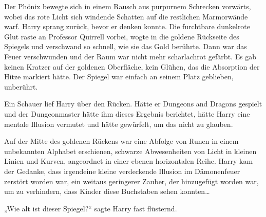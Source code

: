 Der Phönix bewegte sich in einem Rausch aus purpurnem Schrecken vorwärts, wobei das rote Licht sich windende Schatten auf die restlichen Marmorwände warf. Harry sprang zurück, bevor er denken konnte.
Die furchtbare dunkelrote Glut raste an Professor Quirrell vorbei, wogte in die goldene Rückseite des Spiegels und verschwand so schnell, wie sie das Gold berührte.
Dann war das Feuer verschwunden und der Raum war nicht mehr scharlachrot gefärbt.
Es gab keinen Kratzer auf der goldenen Oberfläche, kein Glühen, das die Absorption der Hitze markiert hätte. Der Spiegel war einfach an seinem Platz geblieben, unberührt.

Ein Schauer lief Harry über den Rücken. Hätte er Dungeons and Dragons gespielt und der Dungeonmaster hätte ihm dieses Ergebnis berichtet, hätte Harry eine mentale Illusion vermutet und hätte gewürfelt, um das nicht zu glauben.

Auf der Mitte des goldenen Rückens war eine Abfolge von Runen in einem unbekannten Alphabet erschienen, schwarze Abwesenheiten von Licht in kleinen Linien und Kurven, angeordnet in einer ebenen horizontalen Reihe. Harry kam der Gedanke, dass irgendeine kleine verdeckende Illusion im Dämonenfeuer zerstört worden war, ein weitaus geringerer Zauber, der hinzugefügt worden war, um zu verhindern, dass Kinder diese Buchstaben sehen konnten…

„Wie alt ist dieser Spiegel?“ sagte Harry fast flüsternd.

